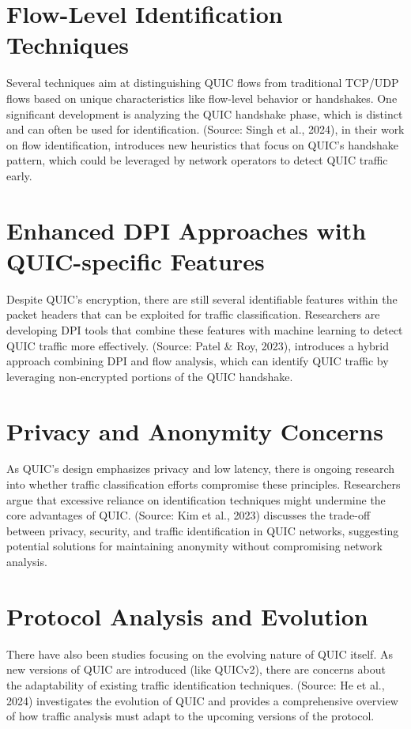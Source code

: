 \documentclass[a4paper, 10pt]{article}
\begin{document}
\section{Flow-Level Identification Techniques}

Several techniques aim at distinguishing QUIC flows from traditional TCP/UDP flows based on unique characteristics like flow-level behavior or handshakes. One significant development is analyzing the QUIC handshake phase, which is distinct and can often be used for identification.
(Source: Singh et al., 2024), in their work on flow identification, introduces new heuristics that focus on QUIC's handshake pattern, which could be leveraged by network operators to detect QUIC traffic early.
\section{Enhanced DPI Approaches with QUIC-specific Features}

Despite QUIC's encryption, there are still several identifiable features within the packet headers that can be exploited for traffic classification. Researchers are developing DPI tools that combine these features with machine learning to detect QUIC traffic more effectively.
(Source: Patel \& Roy, 2023), introduces a hybrid approach combining DPI and flow analysis, which can identify QUIC traffic by leveraging non-encrypted portions of the QUIC handshake.
\section{Privacy and Anonymity Concerns}
As QUIC's design emphasizes privacy and low latency, there is ongoing research into whether traffic classification efforts compromise these principles. Researchers argue that excessive reliance on identification techniques might undermine the core advantages of QUIC.
(Source: Kim et al., 2023) discusses the trade-off between privacy, security, and traffic identification in QUIC networks, suggesting potential solutions for maintaining anonymity without compromising network analysis.
\section{Protocol Analysis and Evolution}
There have also been studies focusing on the evolving nature of QUIC itself. As new versions of QUIC are introduced (like QUICv2), there are concerns about the adaptability of existing traffic identification techniques.
(Source: He et al., 2024) investigates the evolution of QUIC and provides a comprehensive overview of how traffic analysis must adapt to the upcoming versions of the protocol.
\end{document}
